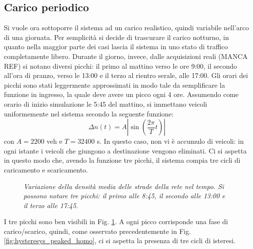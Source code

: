 \documentclass[../main.tex]{subfiles}
\begin{document}
\subsection{Carico periodico}
Si vuole ora sottoporre il sistema ad un carico realistico, quindi variabile nell'arco di una giornata.
Per semplicit\`a si decide di trascurare il carico notturno, in quanto nella maggior parte dei casi lascia il sistema in uno stato di traffico completamente libero.
Durante il giorno, invece, dalle acquisizioni reali (MANCA REF) si notano diversi picchi: il primo al mattino verso le ore 9:00, il secondo all'ora di pranzo, verso le 13:00 e il terzo al rientro serale, alle 17:00.
Gli orari dei picchi sono stati leggermente approssimati in modo tale da semplificare la funzione in ingresso, la quale deve avere un picco ogni 4 ore.
Assumendo come orario di inizio simulazione le 5:45 del mattino, si immettano veicoli uniformemente nel sistema secondo la seguente funzione:
\begin{equation}
    \Delta n(t) = A \left\lvert \sin\left(\frac{2\pi}{T}t\right) \right\rvert 
\end{equation}
con $A = 2200$ veh e $T = 32400$ s.
In questo caso, non vi \`e accumulo di veicoli: in ogni istante i veicoli che giungono a destinazione vengono eliminati.
Ci si aspetta in questo modo che, avendo la funzione tre picchi, il sistema compia tre cicli di caricamento e scaricamento.
\begin{figure}[H]
    \centering
    \caption[Variazione periodica della densit\`a in un reticolo omogeneo]{\emph{Variazione della densit\`a media delle strade della rete nel tempo. Si possono notare tre picchi: il primo alle 8:45, il secondo alle 13:00 e il terzo alle 17:45.}}
    \label{fig:density_time_periodic_homo}
\end{figure}
I tre picchi sono ben visibili in Fig. \ref{fig:density_time_periodic_homo}.
A ogni picco corrisponde una fase di carico/scarico, quindi, come osservato precedentemente in Fig. \ref{fig:hysteresys_peaked_homo}, ci si aspetta la presenza di tre cicli di isteresi.
\end{document}
